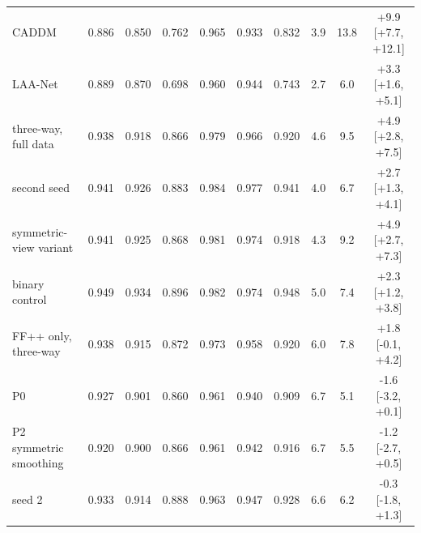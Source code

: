 \begin{tabular}{@{}l ccc ccc ccc@{}}
CADDM~\cite{caddm} & 0.886 & 0.850 & 0.762 & 0.965 & 0.933 & 0.832 & 3.9 & 13.8 & +9.9 [+7.7, +12.1] \\
LAA-Net~\cite{laanet} & 0.889 & 0.870 & 0.698 & 0.960 & 0.944 & 0.743 & 2.7 & 6.0 & +3.3 [+1.6, +5.1] \\
\ours{} three-way, full data & 0.938 & 0.918 & 0.866 & 0.979 & 0.966 & 0.920 & 4.6 & 9.5 & +4.9 [+2.8, +7.5] \\
\quad second seed & 0.941 & 0.926 & 0.883 & 0.984 & 0.977 & 0.941 & 4.0 & 6.7 & +2.7 [+1.3, +4.1] \\
\quad symmetric-view variant & 0.941 & 0.925 & 0.868 & 0.981 & 0.974 & 0.918 & 4.3 & 9.2 & +4.9 [+2.7, +7.3] \\
\ours{} binary control & 0.949 & 0.934 & 0.896 & 0.982 & 0.974 & 0.948 & 5.0 & 7.4 & +2.3 [+1.2, +3.8] \\
\midrule
\ours{} FF++ only, three-way & 0.938 & 0.915 & 0.872 & 0.973 & 0.958 & 0.920 & 6.0 & 7.8 & +1.8 [-0.1, +4.2] \\
\ours{} P0 & 0.927 & 0.901 & 0.860 & 0.961 & 0.940 & 0.909 & 6.7 & 5.1 & -1.6 [-3.2, +0.1] \\
\ours{} P2 symmetric smoothing & 0.920 & 0.900 & 0.866 & 0.961 & 0.942 & 0.916 & 6.7 & 5.5 & -1.2 [-2.7, +0.5] \\
\quad seed 2 & 0.933 & 0.914 & 0.888 & 0.963 & 0.947 & 0.928 & 6.6 & 6.2 & -0.3 [-1.8, +1.3] \\
\bottomrule
\end{tabular}
